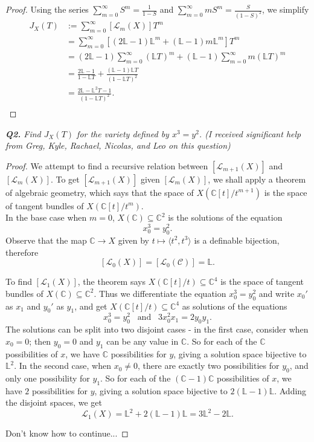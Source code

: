 \documentclass{article}
\begin{document}
\begin{proof}
  Using the series $\displaystyle\sum_{m=0}^\infty S^m =\frac{1}{1-S}$
  and $\displaystyle\sum_{m=0}^\infty mS^m =\frac{S}{(1-S)^2}$, we simplify
  \begin{align*}
    J_X(T) &:=\sum_{m=0}^\infty [\mathcal{L}_m(X)]T^m\\
      &=\sum_{m=0}^\infty [(2\mathbb{L}-1)\mathbb{L}^m
        +(\mathbb{L}-1)m\mathbb{L}^m] T^m\\
      &=(2\mathbb{L}-1) \sum_{m=0}^\infty (\mathbb{L}T)^m +(\mathbb{L}-1)
        \sum_{m=0}^\infty m(\mathbb{L}T)^m\\
      &=\frac{2\mathbb{L}-1}{1-\mathbb{L}T}
        +\frac{(\mathbb{L}-1)\mathbb{L}T}{(1-\mathbb{L}T)^2}\\
      &=\frac{2\mathbb{L}-\mathbb{L}^2T-1}{(1-\mathbb{L}T)^2}.\\
  \end{align*}
\end{proof}

\it \textbf{Q2.} Find $J_X(T)$ for the variety defined by $x^3=y^2$. (I
received significant help from Greg, Kyle, Rachael, Nicolas, and Leo on
this question)
\begin{proof}
  We attempt to find a recursive relation between $[\mathcal{L}_{m+1}(X)]$
  and $[\mathcal{L}_{m}(X)]$. To get $[\mathcal{L}_{m+1}(X)]$ given
  $[\mathcal{L}_{m}(X)]$, we shall apply a theorem of algebraic geometry,
  which says that the space of $X(\mathbb{C}[t]/t^{m+1})$ is the space of
  tangent bundles of $X(\mathbb{C}[t]/t^{m})$. \\

  In the base case when $m=0$, $X(\mathbb{C}) \subseteq\mathbb{C}^2$
  is the solutions of the equation
  \[x_0^3=y_0^2.\]
  Observe that the map $\mathbb{C}\rightarrow X$ given by $t\mapsto\langle
  t^2,t^3\rangle$ is a definable bijection, therefore
  \[[\mathcal{L}_0(X)] =[\mathcal{L}_0(\mathcal{C})] =\mathbb{L}.\]

  To find $[\mathcal{L}_{1}(X)]$, the theorem says $X(\mathbb{C}[t]/t)
  \subseteq\mathbb{C}^4$ is the space of tangent bundles of
  $X(\mathbb{C})\subseteq\mathbb{C}^2$. Thus we differentiate the
  equation $x_0^3=y_0^2$ and write $x_0'$ as $x_1$ and $y_0'$ as $y_1$, and
  get $X(\mathbb{C}[t]/t) \subseteq\mathbb{C}^4$ as solutions of the
  equations
  \[x_0^3=y_0^2\;\;\; \text{and}\;\;\; 3x_0^2x_1=2y_0y_1.\]
  The solutions can be split into two disjoint cases - in the first case,
  consider when $x_0=0$; then $y_0=0$ and $y_1$ can be any value in
  $\mathbb{C}$. So for each of the $\mathbb{C}$ possibilities of $x$, we
  have $\mathbb{C}$ possibilities for $y$, giving a solution space
  bijective to $\mathbb{L}^2$. In the second case, when $x_0\neq0$, there
  are exactly two possibilities for $y_0$, and only one possibility for
  $y_1$. So for each of the $(\mathbb{C}-1)\mathbb{C}$ possibilities of
  $x$, we have $2$ possibilities for $y$, giving a solution space bijective
  to $2(\mathbb{L}-1)\mathbb{L}$. Adding the disjoint spaces, we get
  \[\mathcal{L}_1(X) =\mathbb{L}^2 +2(\mathbb{L}-1)\mathbb{L}
  =3\mathbb{L}^2-2\mathbb{L}.\]

  Don't know how to continue...
\end{proof}
\end{document}
